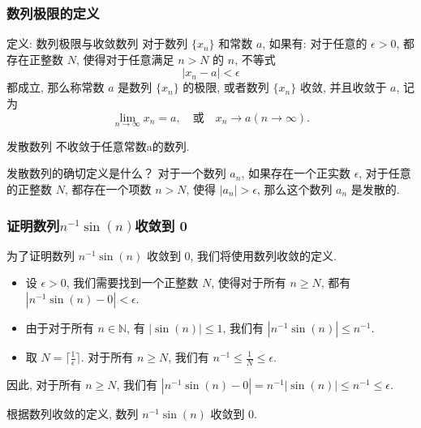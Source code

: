 \documentclass[
10pt, 
aspectratio=43, 
]{beamer}
\begin{document}
\subsubsection{数列极限的定义}
\begin{frame}
	\begin{block}{定义: 数列极限与收敛数列}
		对于数列 $\{x_n\}$ 和常数 $a$, 如果有: 对于任意的 $\epsilon>0$, 都存在正整数 $N$, 使得对于任意满足 $n>N$ 的 $n$, 不等式
		$$|x_n-a|<\epsilon$$
		都成立, 
		那么称常数 $a$ 是数列 $\{x_n\}$ 的极限, 或者数列 $\{x_n\}$ 收敛, 并且收敛于 $a$, 记为
		\begin{equation*}
			\lim_{n\to\infty}x_n=a,  \quad \text{或} \quad x_n\to a (n\to\infty).
		\end{equation*}
	\end{block}
	\pause
	\begin{block}{发散数列}
		不收敛于任意常数a的数列. 
	\end{block}
	\pause
	\begin{exampleblock}{发散数列的确切定义是什么？}
		对于一个数列 ${a_n}$, 如果存在一个正实数 $\epsilon$, 对于任意的正整数 $N$, 都存在一个项数 $n>N$, 使得 $|a_n|>\epsilon$, 那么这个数列 ${a_n}$ 是发散的. 
	\end{exampleblock}
\end{frame}


\begin{frame}
	\frametitle{证明数列$n^{-1}\sin(n)$收敛到 0}
	
	为了证明数列 $n^{-1}\sin(n)$ 收敛到 0, 我们将使用数列收敛的定义. 
	
	\pause
	
	\begin{itemize}
		\item 设 $\epsilon > 0$, 我们需要找到一个正整数 $N$, 使得对于所有 $n \geq N$, 都有 $|n^{-1}\sin(n) - 0| < \epsilon$. 
		      
		      \pause
		      
		\item 由于对于所有 $n \in \mathbb{N}$, 有 $|\sin(n)| \leq 1$, 我们有 $|n^{-1}\sin(n)| \leq n^{-1}$. 
		      
		      \pause
		      
		\item 取 $N = \lceil \frac{1}{\epsilon} \rceil$. 对于所有 $n \geq N$, 我们有 $n^{-1} \leq \frac{1}{N} \leq \epsilon$. 
		      
		      
	\end{itemize}
	
	\pause
	
	因此, 对于所有 $n \geq N$, 我们有 $|n^{-1}\sin(n) - 0| = n^{-1}|\sin(n)| \leq n^{-1} \leq \epsilon$. 
	
	\pause
	
	根据数列收敛的定义, 数列 $n^{-1}\sin(n)$ 收敛到 0. 
	
\end{frame}
\end{document}

